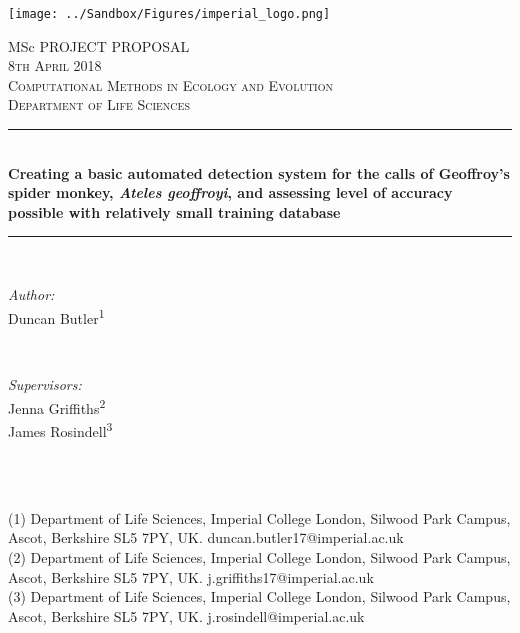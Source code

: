 \documentclass[11pt]{article}
\begin{document}
\begin{titlepage}
	
	\newcommand{\HRule}{\rule{\linewidth}{0.5mm}} %
	
	\texttt{[image: ../Sandbox/Figures/imperial\_logo.png]}\\[1cm]
	
	\center %
	
	\LARGE MSc PROJECT PROPOSAL\\
	\textsc{\large 8th April 2018}\\[1cm]
	\textsc{\Large Computational Methods in Ecology and Evolution}\\[0.5cm]
	\textsc{\large Department of Life Sciences}\\[0.5cm]
	
	\HRule \\[0.4cm]
	{ \huge \bfseries Creating a basic automated detection system for the calls of Geoffroy's spider monkey, \textit{Ateles geoffroyi}, and assessing level of accuracy possible with relatively small training database}\\[0.2cm] 
	\HRule \\[1.5cm]
	
	\begin{minipage}{0.4\textwidth}
		\begin{flushleft} \large
			\emph{Author:}\\
			Duncan Butler\textsuperscript{1}
		\end{flushleft}
	\end{minipage}
	~
	\begin{minipage}{0.4\textwidth}
		\begin{flushright} \large
			\emph{Supervisors:} \\
			Jenna Griffiths\textsuperscript{2} \\
			James Rosindell\textsuperscript{3} \\[1.2em] 
		\end{flushright}
	\end{minipage}\\[1.5cm]
	~
	\begin{minipage}{0.85\textwidth}
		\begin{flushleft} \small
			(1) Department of Life Sciences, Imperial College London, Silwood Park Campus, Ascot, Berkshire SL5 7PY, UK. {duncan.butler17@imperial.ac.uk}\\[0.5em] 
			(2) Department of Life Sciences, Imperial College London, Silwood Park Campus, Ascot, Berkshire SL5 7PY, UK. {j.griffiths17@imperial.ac.uk}\\[0.5em] 
			(3) Department of Life Sciences, Imperial College London, Silwood Park Campus, Ascot, Berkshire SL5 7PY, UK. {j.rosindell@imperial.ac.uk} \\[0.5em] 
			
		\end{flushleft}
	\end{minipage}\\[2em]
	
	\vfill %
	
	\end{titlepage}
\end{document}
